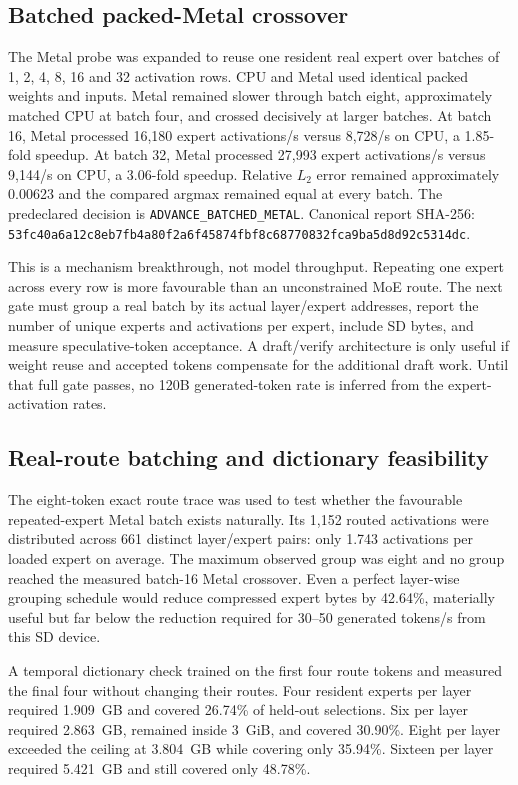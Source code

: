\subsection{Batched packed-Metal crossover}
The Metal probe was expanded to reuse one resident real expert over batches of
1, 2, 4, 8, 16 and 32 activation rows.  CPU and Metal used identical packed
weights and inputs.  Metal remained slower through batch eight, approximately
matched CPU at batch four, and crossed decisively at larger batches.  At batch
16, Metal processed 16,180 expert activations/s versus 8,728/s on CPU, a
1.85-fold speedup.  At batch 32, Metal processed 27,993 expert activations/s
versus 9,144/s on CPU, a 3.06-fold speedup.  Relative $L_2$ error remained
approximately 0.00623 and the compared argmax remained equal at every batch.
The predeclared decision is \texttt{ADVANCE\_BATCHED\_METAL}.  Canonical
report SHA-256:
\texttt{53fc40a6a12c8eb7fb4a80f2a6f45874fbf8c68770832fca9ba5d8d92c5314dc}.

This is a mechanism breakthrough, not model throughput.  Repeating one expert
across every row is more favourable than an unconstrained MoE route.  The next
gate must group a real batch by its actual layer/expert addresses, report the
number of unique experts and activations per expert, include SD bytes, and
measure speculative-token acceptance.  A draft/verify architecture is only
useful if weight reuse and accepted tokens compensate for the additional draft
work.  Until that full gate passes, no 120B generated-token rate is inferred
from the expert-activation rates.

\subsection{Real-route batching and dictionary feasibility}
The eight-token exact route trace was used to test whether the favourable
repeated-expert Metal batch exists naturally.  Its 1,152 routed activations
were distributed across 661 distinct layer/expert pairs: only 1.743
activations per loaded expert on average.  The maximum observed group was
eight and no group reached the measured batch-16 Metal crossover.  Even a
perfect layer-wise grouping schedule would reduce compressed expert bytes by
42.64\%, materially useful but far below the reduction required for
30--50 generated tokens/s from this SD device.

A temporal dictionary check trained on the first four route tokens and measured
the final four without changing their routes.  Four resident experts per layer
required 1.909~GB and covered 26.74\% of held-out selections.  Six per layer
required 2.863~GB, remained inside 3~GiB, and covered 30.90\%.  Eight per
layer exceeded the ceiling at 3.804~GB while covering only 35.94\%.
Sixteen per layer required 5.421~GB and still covered only 48.78\%.

